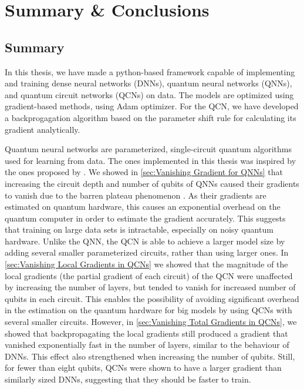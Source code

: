 \chapter{Summary \& Conclusions}\label{chap:Conclusion}

\section{Summary}\label{sec:Summary}
In this thesis, we have made a python-based framework capable of implementing and training dense neural networks (DNNs), quantum neural networks (QNNs), and quantum circuit networks (QCNs) on data. The models are optimized using gradient-based methods, using Adam optimizer. For the QCN, we have developed a backprogagation algorithm based on the parameter shift rule for calculating its gradient analytically.

Quantum neural networks are parameterized, single-circuit quantum algorithms used for learning from data. The ones implemented in this thesis was inspired by the ones proposed by \citet{abbas2020power}. We showed in \cref{sec:Vanishing Gradient for QNNs} that increasing the circuit depth and number of qubits of QNNs caused their gradients to vanish due to the barren plateau phenomenon \cite{McClean_2018}. As their gradients are estimated on quantum hardware, this causes an exponential overhead on the quantum computer in order to estimate the gradient accurately. This suggests that training on large data sets is intractable, especially on noisy quantum hardware. Unlike the QNN, the QCN is able to achieve a larger model size by adding several smaller parameterized circuits, rather than using larger ones. In \autoref{sec:Vanishing Local Gradients in QCNs} we showed that the magnitude of the local gradients (the partial gradient of each circuit) of the QCN were unaffected by increasing the number of layers, but tended to vanish for increased number of qubits in each circuit. This enables the possibility of avoiding significant overhead in the estimation on the quantum hardware for big models by using QCNs with several smaller circuits. However, in \autoref{sec:Vanishing Total Gradients in QCNs}, we showed that backpropagating the local gradients still produced a gradient that vanished exponentially fast in the number of layers, similar to the behaviour of DNNs. This effect also strengthened when increasing the number of qubits. Still, for fewer than eight qubits, QCNs were shown to have a larger gradient than similarly sized DNNs, suggesting that they should be faster to train.

